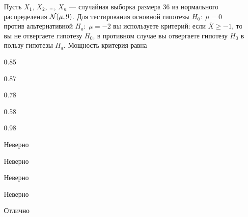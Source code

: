 
\begin{question}
Пусть \(X_1\), \(X_2\), \ldots, \(X_n\) --- случайная выборка размера 36
из нормального распределения \(\mathcal{N}(\mu, 9)\). Для тестирования основной
гипотезы \(H_0: \; \mu=0\)\\
против альтернативной \(H_a: \; \mu=-2\) вы используете критерий: если
\(\bar{X}\geq -1\), то вы не отвергаете гипотезу \(H_0\), в противном
случае вы отвергаете гипотезу \(H_0\) в пользу гипотезы \(H_a\).
Мощность критерия равна
\begin{answerlist}
  \item 0.85
  \item 0.87
  \item 0.78
  \item 0.58
  \item 0.98
\end{answerlist}
\end{question}

\begin{solution}
\begin{answerlist}
  \item Неверно
  \item Неверно
  \item Неверно
  \item Неверно
  \item Отлично
\end{answerlist}
\end{solution}

